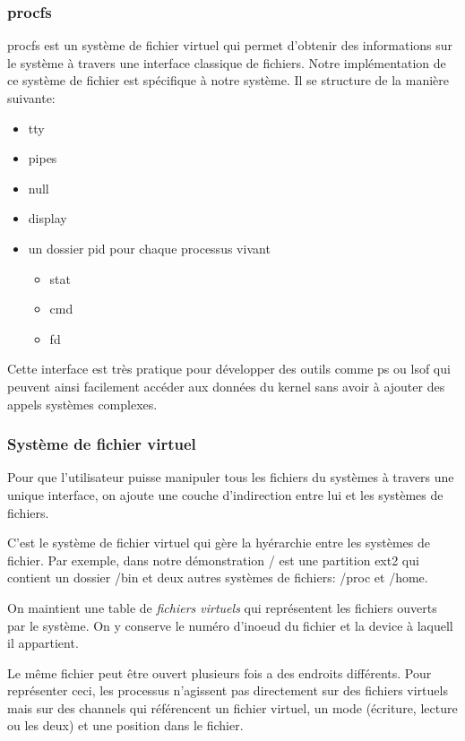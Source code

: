 \documentclass[10pt,a4paper]{beamer}
\begin{document}
\begin{frame}
  \frametitle{procfs}

  \textrm{procfs} est un système de fichier virtuel qui permet d'obtenir des informations sur le système à travers une interface classique de fichiers. Notre implémentation de ce système de fichier est spécifique à notre système. Il se structure de la manière suivante:

  \begin{itemize}
  \item tty
  \item pipes
  \item null
  \item display
  \item un dossier \textrm{pid} pour chaque processus vivant
    \begin{itemize}
    \item stat
    \item cmd
    \item fd
    \end{itemize}
  \end{itemize}

  Cette interface est très pratique pour développer des outils comme \textrm{ps} ou \textrm{lsof} qui peuvent ainsi facilement accéder aux données du kernel sans avoir à ajouter des appels systèmes complexes.
\end{frame}

\begin{frame}
  \frametitle{Système de fichier virtuel}

  Pour que l'utilisateur puisse manipuler tous les fichiers du systèmes à travers une unique interface, on ajoute une couche d'indirection entre lui et les systèmes de fichiers.

  C'est le système de fichier virtuel qui gère la hyérarchie entre les systèmes de fichier. Par exemple, dans notre démonstration \textrm{/} est une partition \textrm{ext2} qui contient un dossier \textrm{/bin} et deux autres systèmes de fichiers: \textrm{/proc} et \textrm{/home}.

  On maintient une table de \textit{fichiers virtuels} qui représentent les fichiers ouverts par le système. On y conserve le numéro d'inoeud du fichier et la device à laquell il appartient.

  Le même fichier peut être ouvert plusieurs fois a des endroits différents. Pour représenter ceci, les processus n'agissent pas directement sur des fichiers virtuels mais sur des channels qui référencent un fichier virtuel, un mode (écriture, lecture ou les deux) et une position dans le fichier.
\end{frame}
\end{document}
